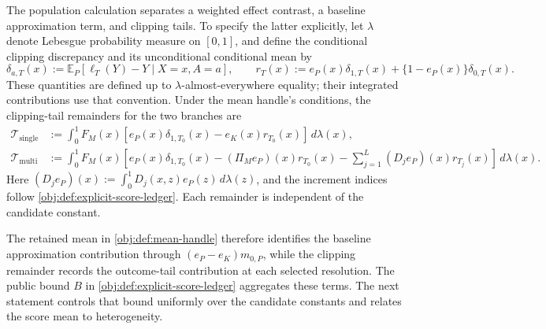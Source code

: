 The population calculation separates a weighted effect contrast, a baseline approximation term, and clipping tails. To specify the latter explicitly, let \(\lambda\) denote Lebesgue probability measure on \([0,1]\), and define the conditional clipping discrepancy and its unconditional conditional mean by
\[
\delta_{a,T}(x)
:=\mathbb E_P[\ell_T(Y)-Y\mid X=x,A=a],
\qquad
r_T(x):=e_P(x)\delta_{1,T}(x)
+\{1-e_P(x)\}\delta_{0,T}(x).
\]
These quantities are defined up to \(\lambda\)-almost-everywhere equality; their integrated contributions use that convention. Under the mean handle's conditions, the clipping-tail remainders for the two branches are
\[
\begin{aligned}
\mathcal T_{\mathrm{single}}
&:=\int_0^1 F_M(x)
\left[e_P(x)\delta_{1,T_0}(x)
-e_K(x)r_{T_0}(x)\right]\,d\lambda(x),\\
\mathcal T_{\mathrm{multi}}
&:=\int_0^1 F_M(x)
\left[
e_P(x)\delta_{1,T_0}(x)
-(\Pi_Me_P)(x)r_{T_0}(x)
-\sum_{j=1}^{L}(D_je_P)(x)r_{T_j}(x)
\right]\,d\lambda(x).
\end{aligned}
\]
Here \((D_je_P)(x):=\int_0^1D_j(x,z)e_P(z)\,d\lambda(z)\), and the increment indices follow \cref{obj:def:explicit-score-ledger}. Each remainder is independent of the candidate constant.

The retained mean in \cref{obj:def:mean-handle} therefore identifies the baseline approximation contribution through \((e_P-e_K)m_{0,P}\), while the clipping remainder records the outcome-tail contribution at each selected resolution. The public bound \(B\) in \cref{obj:def:explicit-score-ledger} aggregates these terms. The next statement controls that bound uniformly over the candidate constants and relates the score mean to heterogeneity.

